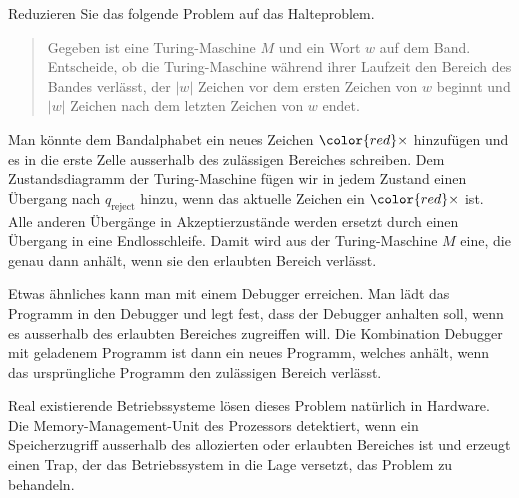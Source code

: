 Reduzieren Sie das folgende Problem auf das Halteproblem.

\begin{quote}
Gegeben ist eine Turing-Maschine $M$ und ein Wort $w$ auf dem Band.
Entscheide, ob die Turing-Maschine während ihrer Laufzeit den 
Bereich des Bandes verlässt, der $|w|$ Zeichen vor dem ersten
Zeichen von $w$ beginnt und $|w|$ Zeichen nach dem letzten Zeichen
von $w$ endet.
\end{quote}

\begin{center}
\end{center}


\begin{loesung}
Man könnte dem Bandalphabet ein neues Zeichen $\color{red}\times$
hinzufügen und es in die erste Zelle ausserhalb des zulässigen 
Bereiches schreiben.
Dem Zustandsdiagramm der Turing-Maschine fügen wir in jedem Zustand
einen Übergang nach $q_{\text{reject}}$ hinzu, wenn das aktuelle Zeichen
ein ${\color{red}\times}$ ist.
Alle anderen Übergänge in Akzeptierzustände werden ersetzt durch einen
Übergang in eine Endlosschleife.
Damit wird aus der Turing-Maschine $M$ eine, die genau dann anhält,
wenn sie den erlaubten Bereich verlässt.

Etwas ähnliches kann man mit einem Debugger erreichen.
Man lädt das Programm in den Debugger und legt fest, dass
der Debugger anhalten soll, wenn es ausserhalb des erlaubten Bereiches
zugreiffen will.
Die Kombination Debugger mit geladenem Programm ist dann ein neues
Programm, welches anhält, wenn das ursprüngliche Programm den zulässigen
Bereich verlässt.

Real existierende Betriebssysteme lösen dieses Problem natürlich in 
Hardware.
Die Memory-Management-Unit des Prozessors detektiert, wenn ein
Speicherzugriff ausserhalb des allozierten oder erlaubten Bereiches ist 
und erzeugt einen Trap, der das Betriebssystem in die Lage versetzt,
das Problem zu behandeln.
\end{loesung}
